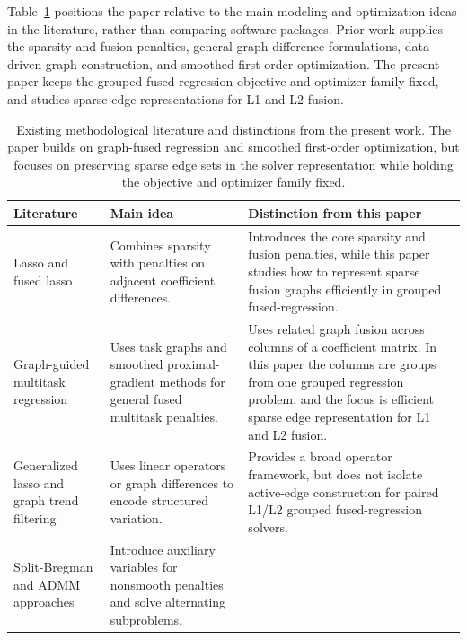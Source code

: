 \documentclass[twoside,11pt]{article}
\begin{document}
Table~\ref{tab:literature-comparison} positions the paper relative to the
main modeling and optimization ideas in the literature, rather than comparing
software packages. Prior work supplies the sparsity and fusion penalties,
general graph-difference formulations, data-driven graph construction, and
smoothed first-order optimization. The present paper keeps the grouped
fused-regression objective and optimizer family fixed, and studies sparse
edge representations for L1 and L2 fusion.

\begin{table}[t]
\centering
\scriptsize
\caption{Existing methodological literature and distinctions from the present work.
The paper builds on graph-fused regression and smoothed first-order optimization, but focuses on preserving sparse edge sets in the solver representation while holding the objective and optimizer family fixed.}
\label{tab:literature-comparison}
{\setlength{\tabcolsep}{3pt}
\renewcommand{\arraystretch}{0.92}
\begin{tabular}{@{}>{\raggedright\arraybackslash}p{}
>{\raggedright\arraybackslash}p{}
>{\raggedright\arraybackslash}p{}@{}}
\toprule
Literature & Main idea & Distinction from this paper \\
\midrule
Lasso and fused lasso \citep{tibshirani1996lasso,tibshirani2005fused} &
Combines sparsity with penalties on adjacent coefficient differences. &
Introduces the core sparsity and fusion penalties, while this paper studies how to represent sparse fusion graphs efficiently in grouped fused-regression. \\
Graph-guided multitask regression \citep{chen2010graph,chen2012smoothing,chen2012twograph} &
Uses task graphs and smoothed proximal-gradient methods for general fused multitask penalties. &
Uses related graph fusion across columns of a coefficient matrix. In this paper the columns are groups from one grouped regression problem, and the focus is efficient sparse edge representation for L1 and L2 fusion. \\
Generalized lasso and graph trend filtering \citep{tibshirani2011genlasso,wang2016graphtf} &
Uses linear operators or graph differences to encode structured variation. &
Provides a broad operator framework, but does not isolate active-edge construction for paired L1/L2 grouped fused-regression solvers. \\
Split-Bregman and ADMM approaches \citep{ye2011split,boyd2011admm} &
Introduce auxiliary variables for nonsmooth penalties and solve alternating subproblems. &

\end{tabular}}
\end{table}
\end{document}
